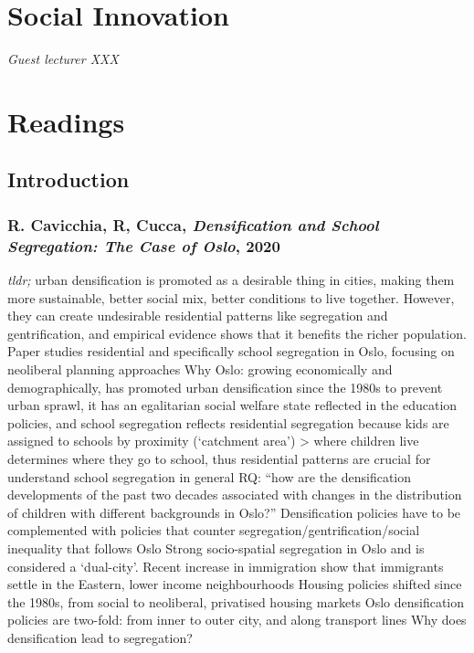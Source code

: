 \documentclass{article}
\begin{document}
\section{Social Innovation}

\textit{Guest lecturer XXX}


\section{Readings}

\subsection{Introduction}

\subsubsection{R. Cavicchia, R, Cucca, \textit{Densification and School Segregation: The Case of Oslo}, 2020}

\begin{outline}
	\1 \textit{tldr;} urban densification is promoted as a desirable thing in cities, making them more sustainable, better social mix, better conditions to live together. However, they can create undesirable residential patterns like segregation and gentrification, and empirical evidence shows that it benefits the richer population. Paper studies residential and specifically school segregation in Oslo, focusing on neoliberal planning approaches
	\1 Why Oslo: growing economically and demographically, has promoted urban densification since the 1980s to prevent urban sprawl, it has an egalitarian social welfare state reflected in the education policies, and school segregation reflects residential segregation because kids are assigned to schools by proximity (`catchment area') > where children live determines where they go to school, thus residential patterns are crucial for understand school segregation in general
	\1 RQ: ``how are the densification developments of the past two decades associated with changes in the distribution of children with different backgrounds in Oslo?''
	\1 Densification policies have to be complemented with policies that counter segregation/gentrification/social inequality that follows
	\1 Oslo
		\2 Strong socio-spatial segregation in Oslo and is considered a `dual-city'. Recent increase in immigration show that immigrants settle in the Eastern, lower income neighbourhoods
		\2 Housing policies shifted since the 1980s, from social to neoliberal, privatised housing markets
		\2 Oslo densification policies are two-fold: from inner to outer city, and along transport lines
	\1 Why does densification lead to segregation?
		\2 
\end{outline}
\end{document}
